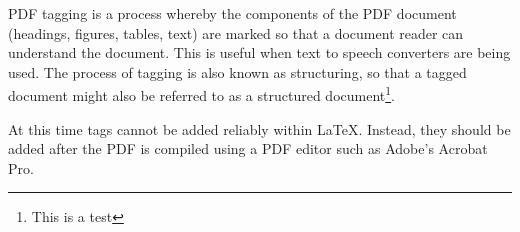 PDF tagging is a process whereby the components of the PDF document (headings, figures, tables, text) are marked so that a document reader can understand the document. This is useful when text to speech converters are being used. The process of tagging is also known as structuring, so that a tagged document might also be referred to as a structured document\footnote{This is a test}.

At this time tags cannot be added reliably within LaTeX. Instead, they should be added after the PDF is compiled using a PDF editor such as Adobe's Acrobat Pro. 
